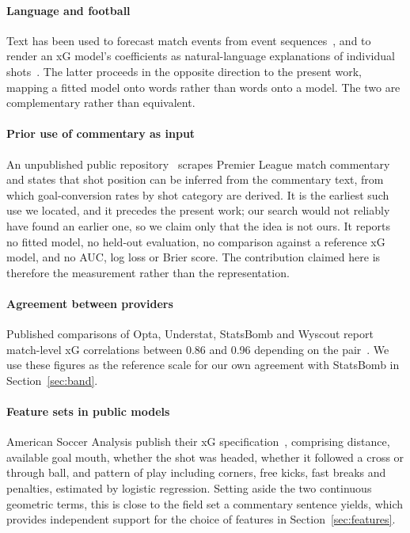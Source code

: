 \documentclass[conference]{IEEEtran}
\newcommand{\num}[1]{\mbox{#1}}
\begin{document}
\paragraph{Language and football}
Text has been used to forecast match events from event
sequences~\cite{mendesneves2024forecasting}, and to render an xG model's
coefficients as natural-language explanations of individual
shots~\cite{rahimian2025wordalisations}. The latter proceeds in the opposite
direction to the present work, mapping a fitted model onto words rather than
words onto a model. The two are complementary rather than equivalent.

\paragraph{Prior use of commentary as input}
An unpublished public repository~\cite{ballard2020moneyball} scrapes Premier
League match commentary and states that shot position can be inferred from the
commentary text, from which goal-conversion rates by shot category are derived.
It is the earliest such use we located, and it precedes the present work; our
search would not reliably have found an earlier one, so we claim only that the
idea is not ours. It reports no fitted model, no
held-out evaluation, no comparison against a reference xG model, and no AUC,
log loss or Brier score. The contribution claimed here is therefore the
measurement rather than the representation.

\paragraph{Agreement between providers}
Published comparisons of Opta, Understat, StatsBomb and Wyscout report
match-level xG correlations between \num{0.86} and \num{0.96} depending on the
pair~\cite{pythonfootball2024providers}. We use these figures as the reference
scale for our own agreement with StatsBomb in Section~\ref{sec:band}.

\paragraph{Feature sets in public models}
American Soccer Analysis publish their xG specification~\cite{asa2015xg3},
comprising distance, available goal mouth, whether the shot was headed,
whether it followed a cross or through ball, and pattern of play including
corners, free kicks, fast breaks and penalties, estimated by logistic
regression. Setting aside the two continuous geometric terms, this is close to
the field set a commentary sentence yields, which provides independent support
for the choice of features in Section~\ref{sec:features}.
\end{document}
